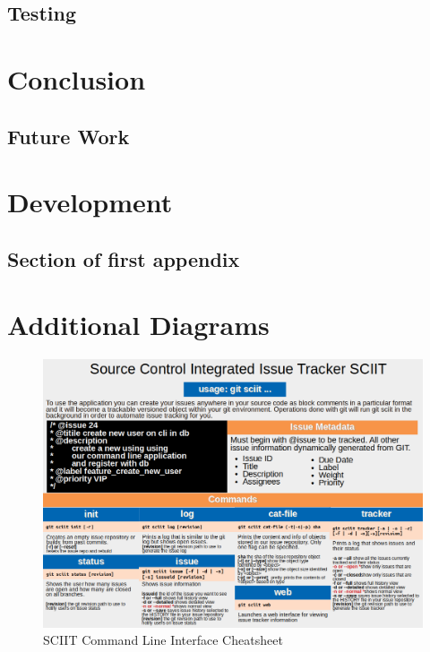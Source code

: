 \documentclass{mproj}
\begin{document}
\section{Testing}


\chapter{Conclusion}\label{conclusion}

\section{Future Work}

\appendix %
\chapter{Development}

\section{Section of first appendix}

\chapter{Additional Diagrams}
\begin{figure}[h!]
\caption{SCIIT Command Line Interface Cheatsheet}
\label{fig:sciit-cheatsheet}
\centering
\includegraphics[width=16cm]{Cheatsheet}
\end{figure}





\end{document}
